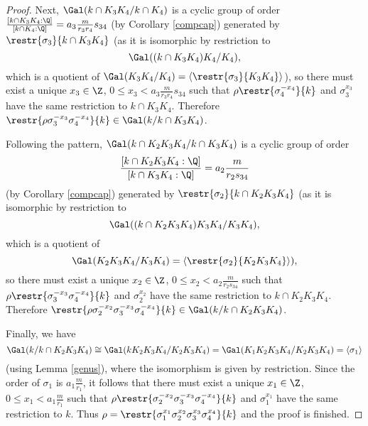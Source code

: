 \begin{proof}
Next, $\Gal(k\cap K_3K_4/k\cap K_4)$ is a cyclic group of order $\frac{[k\cap K_3K_4:\Q]}{[k\cap K_4:\Q]}=a_3\frac{m}{r_3r_4}s_{34}$ (by Corollary \ref{compcap}) generated by $\restr{\sigma_3}{k\cap K_3K_4}$ (as it is isomorphic by restriction to $$\Gal((k\cap K_3K_4)K_4 / K_4),$$ which is a quotient of $\Gal(K_3K_4/K_4)=\langle \restr{\sigma_3}{K_3K_4}\rangle$), so there must exist a unique $x_3\in \Z$, $0\leq x_3<a_3\frac{m}{r_3r_4}s_{34}$ such that $\rho \restr{\sigma_4^{-x_4}}{k}$ and $\sigma_3^{x_3}$ have the same restriction to $k\cap K_3K_4$. Therefore $\restr{\rho\sigma_3^{-x_3}\sigma_4^{-x_4}}{k}\in \Gal(k/k\cap K_3K_4)$.

Following the pattern, $\Gal(k\cap K_2K_3K_4/k\cap K_3K_4)$ is a cyclic group of order 
$$\frac{[k\cap K_2K_3K_4:\Q]}{[k\cap K_3K_4:\Q]}=a_2\frac{m}{r_2s_{34}}$$ (by Corollary \ref{compcap}) generated by $\restr{\sigma_2}{k\cap K_2K_3K_4}$ (as it is isomorphic by restriction to $$\Gal((k\cap K_2K_3K_4)K_3K_4 / K_3K_4),$$ which is a quotient of $$\Gal(K_2K_3K_4/K_3K_4)=\langle \restr{\sigma_2}{K_2K_3K_4}\rangle),$$ so there must exist a unique $x_2\in \Z$, $0\leq x_2<a_2\frac{m}{r_2s_{34}}$ such that $\rho\restr{\sigma_3^{-x_3}\sigma_4^{-x_4}}{k}$ and $\sigma_2^{x_2}$ have the same restriction to $k\cap K_2K_3K_4$. Therefore $\restr{\rho\sigma_2^{-x_2}\sigma_3^{-x_3}\sigma_4^{-x_4}}{k}\in \Gal(k/k\cap K_2K_3K_4)$.

Finally, we have $$\Gal(k/k\cap K_2K_3K_4)\cong \Gal(kK_2K_3K_4/K_2K_3K_4)=\Gal(K_1K_2K_3K_4/K_2K_3K_4)=\langle\sigma_1\rangle$$
(using Lemma \ref{genus}), where the isomorphism is given by restriction. Since the order of $\sigma_1$ is $a_1\frac{m}{r_1}$, it follows that there must exist a unique $x_1\in \Z$, $0\leq x_1<a_1\frac{m}{r_1}$ such that $\rho\restr{\sigma_2^{-x_2}\sigma_3^{-x_3}\sigma_4^{-x_4}}{k}$ and $\sigma_1^{x_1}$ have the same restriction to $k$. Thus $\rho=\restr{\sigma_1^{x_1}\sigma_2^{x_2}\sigma_3^{x_3}\sigma_4^{x_4}}{k}$ and the proof is finished.

\end{proof}


